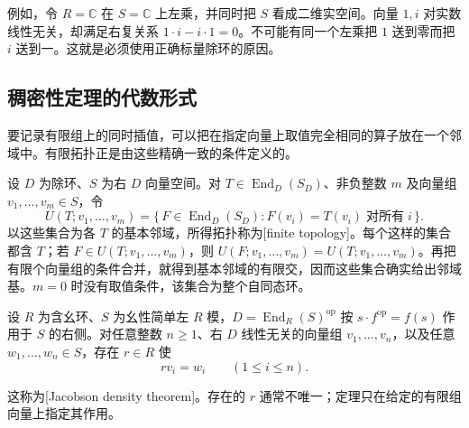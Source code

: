 \ProseParagraphBreak
例如，令 \(R=\mathbb C\) 在 \(S=\mathbb C\) 上左乘，并同时把 \(S\) 看成二维实空间。向量 \(1,i\) 对实数线性无关，却满足右复关系 \(1\cdot i-i\cdot1=0\)。不可能有同一个左乘把 \(1\) 送到零而把 \(i\) 送到一。这就是必须使用正确标量除环的原因。

\subsection{稠密性定理的代数形式}
\label{b2:subsec:1404:02}

要记录有限组上的同时插值，可以把在指定向量上取值完全相同的算子放在一个邻域中。有限拓扑正是由这些精确一致的条件定义的。

\begin{definition}\label{b2:def:finite-topology}
	设 \(D\) 为除环、\(S\) 为右 \(D\) 向量空间。对 \(T\in\operatorname{End}_D(S_D)\)、非负整数 \(m\) 及向量组 \(v_1,\ldots,v_m\in S\)，令
	\[
		U(T;v_1,\ldots,v_m) =\bigl\{\,F\in\operatorname{End}_D(S_D):F(v_i)=T(v_i)\;\text{对所有}\;i\,\bigr\}.
	\]
	以这些集合为各 \(T\) 的基本邻域，所得拓扑称为[finite topology]。每个这样的集合都含 \(T\)；若 \(F\in U(T;v_1,\ldots,v_m)\)，则 \(U(F;v_1,\ldots,v_m)=U(T;v_1,\ldots,v_m)\)。再把有限个向量组的条件合并，就得到基本邻域的有限交，因而这些集合确实给出邻域基。\(m=0\) 时没有取值条件，该集合为整个自同态环。
\end{definition}

\begin{theorem}\label{b2:thm:jacobson-density}
	设 \(R\) 为含幺环、\(S\) 为幺性简单左 \(R\) 模，\(D=\operatorname{End}_R(S)^{\mathrm{op}}\) 按 \(s\cdot f^{\mathrm{op}}=f(s)\) 作用于 \(S\) 的右侧。对任意整数 \(n\ge1\)、右 \(D\) 线性无关的向量组 \(v_1,\ldots,v_n\)，以及任意 \(w_1,\ldots,w_n\in S\)，存在 \(r\in R\) 使
	\[
		rv_i=w_i\qquad(1\le i\le n).
	\]
\end{theorem}

这称为[Jacobson density theorem]。存在的 \(r\) 通常不唯一；定理只在给定的有限组向量上指定其作用。

